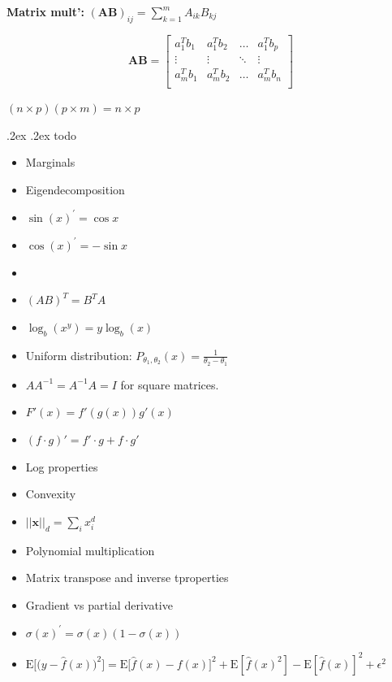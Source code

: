 \documentclass[10pt,landscape,a4paper]{article}
\makeatletter
\newcommand{\vek}[1]{\mathbf{#1}}
\renewcommand{\section}{\@startsection{section}{1}{0mm}%
                                {.2ex}%
                                {.2ex}%
                                {\color{myblue}\sffamily\small\bfseries}}
\makeatother
\begin{document}
\begin{multicols*}{5}
{\bf Matrix mult': } $ (\mathbf{A}\mathbf{B})_{ij} = \sum_{k=1}^m A_{ik}B_{kj}\,$

$$ \vek{AB} =  \begin{bmatrix}
         a_1^Tb_1&  a_1^T b_2 & \hdots & a_1^T b_p \\
         \vdots & \vdots  & \ddots  & \vdots \\
          a_m^T b_1 & a_m^T b_2 & \hdots & a_m^T b_n \\
         \end{bmatrix}
$$

$(n \times p)(p \times m) = n \times p$


\section{todo}
\begin{itemize}
\item Marginals
\item Eigendecomposition
\item $\sin(x)^{'} = \cos{x}$
\item $\cos(x)^{'} = -\sin{x}$
\item 
\item $(AB)^{T} = B^{T}A$
\item $\log_{b}(x^{y}) = y \log_{b}(x)$
\item Uniform distribution: $P_{\theta_1, \theta_2}(x) = \frac{1}{\theta_2 - \theta_1}$
\item $AA^{-1} = A^{-1}A = I$ for square matrices.
\item $F'(x) = f'(g(x)) g'(x)$
\item $(f\cdot g)'=f'\cdot g+f\cdot g' \,\!$
\item Log properties
\item Convexity
\item $\vert \vert \vek{x} \vert \vert_{d} = \sum_{i} x_{i}^{d}$
\item Polynomial multiplication
\item Matrix transpose and inverse tproperties
\item Gradient vs partial derivative
\item $\sigma(x)^{'} = \sigma(x)(1-\sigma(x))$
\item $\mathrm{E}\Big[\big(y - \hat{f}(x)\big)^2\Big] = \mathrm{E}\big[\hat{f}(x) - f(x)\big]^2 + \mathrm{E}[\hat{f}(x)^2] - \mathrm{E}[\hat{f}(x)]^2 + \epsilon^2$
\end{itemize}




\end{multicols*}
\end{document}
